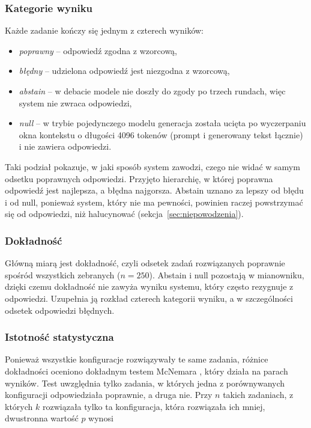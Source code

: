 \subsubsection{Kategorie wyniku}

Każde zadanie kończy się jednym z czterech wyników:
\begin{itemize}
    \item \emph{poprawny} -- odpowiedź zgodna z wzorcową,
    \item \emph{błędny} -- udzielona odpowiedź jest niezgodna z wzorcową,
    \item \emph{abstain} -- w debacie modele nie doszły do zgody po trzech rundach, więc system nie zwraca odpowiedzi,
    \item \emph{null} -- w trybie pojedynczego modelu generacja została ucięta po wyczerpaniu okna kontekstu o długości 4096 tokenów (prompt i generowany tekst łącznie) i nie zawiera odpowiedzi.
\end{itemize}

Taki podział pokazuje, w jaki sposób system zawodzi, czego nie widać w samym odsetku poprawnych odpowiedzi. Przyjęto hierarchię, w której poprawna odpowiedź jest najlepsza, a błędna najgorsza. Abstain uznano za lepszy od błędu i od null, ponieważ system, który nie ma pewności, powinien raczej powstrzymać się od odpowiedzi, niż halucynować (sekcja~\ref{sec:niepowodzenia}).

\subsubsection{Dokładność}

Główną miarą jest dokładność, czyli odsetek zadań rozwiązanych poprawnie spośród wszystkich zebranych ($n = 250$). Abstain i null pozostają w mianowniku, dzięki czemu dokładność nie zawyża wyniku systemu, który często rezygnuje z odpowiedzi. Uzupełnia ją rozkład czterech kategorii wyniku, a w szczególności odsetek odpowiedzi błędnych.

\subsubsection{Istotność statystyczna}

Ponieważ wszystkie konfiguracje rozwiązywały te same zadania, różnice dokładności oceniono dokładnym testem McNemara \cite{mcnemar1947note}, który działa na parach wyników. Test uwzględnia tylko zadania, w których jedna z porównywanych konfiguracji odpowiedziała poprawnie, a druga nie. Przy $n$ takich zadaniach, z których $k$ rozwiązała tylko ta konfiguracja, która rozwiązała ich mniej, dwustronna wartość $p$ wynosi

